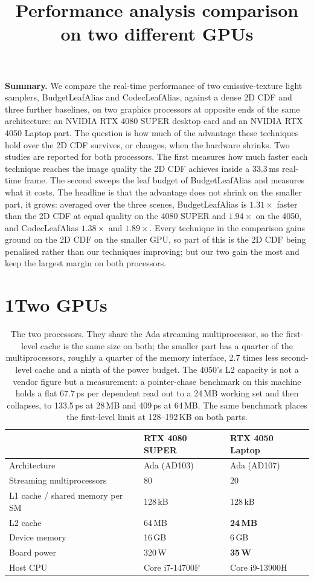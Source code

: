 \documentclass[10pt]{article}
\title{\vspace{-1.6em}Performance analysis comparison on two different GPUs}
\author{}
\date{\vspace{-2.4em}}
\begin{document}
\maketitle
\vspace{-1.0em}

\textbf{Summary.} We compare the real-time performance of two emissive-texture light samplers,
BudgetLeafAlias and CodecLeafAlias, against a dense 2D CDF and three further baselines, on two
graphics processors at opposite ends of the same architecture: an NVIDIA RTX 4080 SUPER desktop card
and an NVIDIA RTX 4050 Laptop part. The question is how much of the advantage these techniques hold
over the 2D CDF survives, or changes, when the hardware shrinks. Two studies are reported for both
processors. The first measures how much faster each technique reaches the image quality the 2D CDF
achieves inside a 33.3\,ms real-time frame. The second sweeps the leaf budget of BudgetLeafAlias and
measures what it costs. The headline is that the advantage does not shrink on the smaller part, it
grows: averaged over the three scenes, BudgetLeafAlias is $1.31\times$ faster than the 2D CDF at
equal quality on the 4080 SUPER and $1.94\times$ on the 4050, and CodecLeafAlias $1.38\times$ and
$1.89\times$. Every technique in the comparison gains ground on the 2D CDF on the smaller GPU, so
part of this is the 2D CDF being penalised rather than our techniques improving; but our two gain
the most and keep the largest margin on both processors.

\section*{1\quad Two GPUs}

\begin{table}[H]
\centering\small
\begin{tabular}{lll}
\toprule
& RTX 4080 SUPER & RTX 4050 Laptop \\
\midrule
Architecture & Ada (AD103) & Ada (AD107) \\
Streaming multiprocessors & 80 & 20 \\
L1 cache / shared memory per SM & 128\,kB & 128\,kB \\
L2 cache & 64\,MB & \textbf{24\,MB} \\
Device memory & 16\,GB & 6\,GB \\
Board power & 320\,W & \textbf{35\,W} \\
Host CPU & Core i7-14700F & Core i9-13900H \\
\bottomrule
\end{tabular}
\caption{The two processors. They share the Ada streaming multiprocessor, so the first-level cache
is the same size on both; the smaller part has a quarter of the multiprocessors, roughly a quarter
of the memory interface, 2.7 times less second-level cache and a ninth of the power budget. The
4050's L2 capacity is not a vendor figure but a measurement: a pointer-chase benchmark on this
machine holds a flat 67.7\,ps per dependent read out to a 24\,MB working set and then collapses, to
133.5\,ps at 28\,MB and 409\,ps at 64\,MB. The same benchmark places the first-level limit at
128--192\,KB on both parts.}
\label{tab:gpus}
\end{table}
\end{document}
